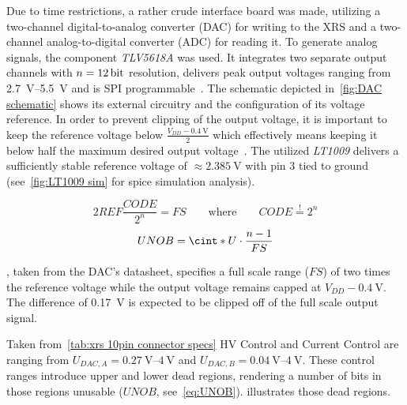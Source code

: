             Due to time restrictions, a rather crude interface board was made, utilizing a two-channel digital-to-analog converter (DAC) for writing to the XRS and a two-channel analog-to-digital converter (ADC) for reading it.
            To generate analog signals, the component \textit{TLV5618A} was used.
            It integrates two separate output channels with \(n = \qty{12}{\bit}\) resolution, delivers peak output voltages ranging from \qtyrange{2.7}{5.5}{\volt} and is SPI programmable~\cite{Manual.DAC.TLV5618A}.
            The schematic depicted in~\cref{fig:DAC schematic} shows its external circuitry and the configuration of its voltage reference.
            In order to prevent clipping of the output voltage, it is important to keep the reference voltage below \(\frac{V_{DD} - \qty{0.4}{\volt}}{2}\) which effectively means keeping it below half the maximum desired output voltage~\cite[p. 3]{Manual.DAC.TLV5618A}.
            The utilized \textit{LT1009} delivers a sufficiently stable reference voltage of \(\approx \qty{2.385}{\volt}\) with pin 3 tied to ground (see~\cref{fig:LT1009 sim} for spice simulation analysis).

            \begin{equation}
                2REF\frac{CODE}{2^n} = FS \qquad \text{where} \qquad CODE \overset{!}{=} 2^n
                \label{eq:dac general function}
            \end{equation}
            \begin{align}
                UNOB = \cint*{ U \cdot \frac{n - 1}{FS}}
                \label{eq:UNOB}
            \end{align}

            , taken from the DAC's datasheet, specifies a full scale range (\(FS\)) of two times the reference voltage while the output voltage remains capped at \(V_{DD}- \qty{0.4}{\volt}\).
            The difference of \qty{0.17}{\volt} is expected to be clipped off of the full scale output signal.\par\medskip

            Taken from~\cref{tab:xrs 10pin connector specs} HV Control and Current Control are ranging from \(U_{DAC,A} = \qtyrange{0.27}{4}{\volt}\) and \(U_{DAC,B} = \qtyrange{0.04}{4}{\volt}\).
            These control ranges introduce upper and lower dead regions, rendering a number of bits in those regions unusable (\(UNOB\), see~\cref{eq:UNOB}).
             illustrates those dead regions.

